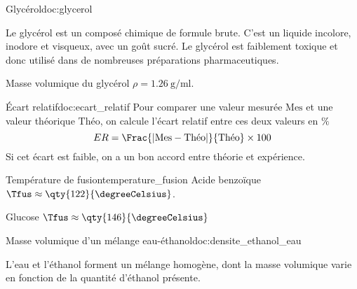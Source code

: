 \begin{doc}{Glycérol}{doc:glycerol}
  \begin{wrapfigure}{r}{0.27\linewidth}
  \end{wrapfigure}
  
  Le glycérol est un composé chimique de formule brute.
  C'est un liquide incolore, inodore et visqueux, avec un goût sucré. 
  Le glycérol est faiblement toxique et donc utilisé dans de nombreuses préparations pharmaceutiques.
  
  Masse volumique du glycérol $\rho = \qty{1,26}{\g/\ml}$.
\end{doc}


\begin{doc}{Écart relatif}{doc:ecart_relatif}
  Pour comparer une valeur mesurée $\text{Mes}$ et une valeur théorique $\text{Théo}$, on calcule l'écart relatif entre ces deux valeurs en $\%$
  \begin{equation*}
    ER = \Frac{|\text{Mes} - \text{Théo}|}{\text{Théo}} \times 100
  \end{equation*}
  Si cet écart est faible, on a un bon accord entre théorie et expérience.
\end{doc}

\begin{doc}{Température de fusion}{temperature_fusion}
  Acide benzoïque $\Tfus \approx \qty{122}{\degreeCelsius}$.
   
  Glucose $\Tfus \approx \qty{146}{\degreeCelsius}$
\end{doc}

\begin{doc}{Masse volumique d'un mélange eau-éthanol}{doc:densite_ethanol_eau}
  \begin{wrapfigure}{r}{0.6\linewidth}
    \begin{center}
    \end{center}
    \phantom{b}
  \end{wrapfigure}
  
  L'eau et l'éthanol forment un mélange homogène, dont la masse volumique varie en fonction de la quantité d'éthanol présente.
\end{doc}

